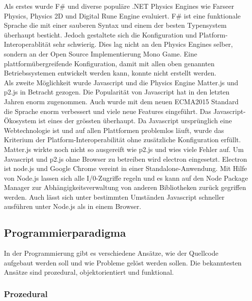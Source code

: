     Als erstes wurde F\# und diverse populäre .NET Physics Engines wie Farseer Physics,
    Physics 2D und Digital Rune Engine evaluiert.
    F\# ist eine funktionale Sprache die mit einer sauberen Syntax und einem der besten Typensystem überhaupt besticht.
    Jedoch gestaltete sich die Konfiguration und Platform-Interoperablität sehr schwierig.
    Dies lag nicht an den Physics Engines selber, sondern an der Open Source Implementierung Mono Game.
    Eine plattformübergreifende Konfiguration,
    damit mit allen oben genannten Betriebssystemen entwickelt werden kann,
    konnte nicht erstellt werden.
    \\
    Als zweite Möglichkeit wurde Javascript und die Physics Engine Matter.js und p2.js in Betracht gezogen.
    Die Popularität von Javascript hat in den letzten Jahren enorm zugenommen.
    Auch wurde mit dem neuen ECMA2015 Standard die Sprache enorm verbessert und viele neue Features eingeführt.
    Das Javascript-Ökosystem ist eines der grössten überhaupt.
    Da Javascript ursprünglich eine Webtechnologie ist und auf allen Plattformen problemlos läuft,
    wurde das Kriterium der Platform-Interoperabilität ohne zusätzliche Konfiguration erfüllt.
    Matter.js wirkte noch nicht so ausgereift wie p2.js und wies viele Fehler auf.
    Um Javascript und p2.js ohne Browser zu betreiben wird electron eingesetzt.
    Electron ist node.js und Google Chrome vereint in einer Standalone-Anwendung.
    Mit Hilfe von Node.js lassen sich alle I/0-Zugriffe regeln und es kann auf den
    Node Package Manager zur Abhängigkeitsverwaltung von anderen Bibliotheken zurück gegriffen werden.
    Auch lässt sich unter bestimmten Umständen Javascript schneller ausführen unter Node.js als in einem Browser.

    \subsection{Programmierparadigma\label{sub:TechnologyParadigma}}

      In der Programmierung gibt es verschiedene Ansätze,
      wie der Quellcode aufgebaut werden soll und wie Probleme gelöst werden sollen.
      Die bekanntesten Ansätze sind prozedural, objektorientiert und funktional.

      \subsubsection{Prozedural\label{subsub:TechnologyParadigmaProzedural}}

